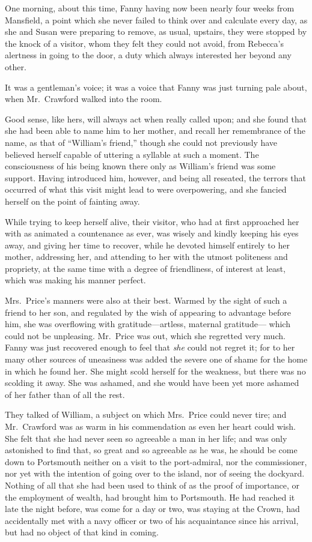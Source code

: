 \documentclass{article}
\begin{document}
One morning, about this time, Fanny having now been nearly
four weeks from Mansfield, a point which she never failed
to think over and calculate every day, as she and Susan
were preparing to remove, as usual, upstairs, they were
stopped by the knock of a visitor, whom they felt they could
not avoid, from Rebecca's alertness in going to the door,
a duty which always interested her beyond any other.

It was a gentleman's voice; it was a voice that Fanny
was just turning pale about, when Mr.\ Crawford walked
into the room.

Good sense, like hers, will always act when really
called upon; and she found that she had been able to name
him to her mother, and recall her remembrance of the name,
as that of ``William's friend,'' though she could not
previously have believed herself capable of uttering a
syllable at such a moment.  The consciousness of his being
known there only as William's friend was some support.
Having introduced him, however, and being all reseated,
the terrors that occurred of what this visit might lead
to were overpowering, and she fancied herself on the point
of fainting away.

While trying to keep herself alive, their visitor, who had
at first approached her with as animated a countenance
as ever, was wisely and kindly keeping his eyes away,
and giving her time to recover, while he devoted himself
entirely to her mother, addressing her, and attending to
her with the utmost politeness and propriety, at the same
time with a degree of friendliness, of interest at least,
which was making his manner perfect.

Mrs.\ Price's manners were also at their best.  Warmed by
the sight of such a friend to her son, and regulated
by the wish of appearing to advantage before him, she was
overflowing with gratitude---artless, maternal gratitude---%
which could not be unpleasing.  Mr.\ Price was out,
which she regretted very much.  Fanny was just recovered
enough to feel that \emph{she} could not regret it; for to her
many other sources of uneasiness was added the severe
one of shame for the home in which he found her.
She might scold herself for the weakness, but there was
no scolding it away.  She was ashamed, and she would have
been yet more ashamed of her father than of all the rest.

They talked of William, a subject on which Mrs.\ Price
could never tire; and Mr.\ Crawford was as warm in his
commendation as even her heart could wish.  She felt
that she had never seen so agreeable a man in her life;
and was only astonished to find that, so great and so
agreeable as he was, he should be come down to Portsmouth
neither on a visit to the port-admiral, nor the commissioner,
nor yet with the intention of going over to the island,
nor of seeing the dockyard.  Nothing of all that she
had been used to think of as the proof of importance,
or the employment of wealth, had brought him to Portsmouth.
He had reached it late the night before, was come for a
day or two, was staying at the Crown, had accidentally
met with a navy officer or two of his acquaintance since
his arrival, but had no object of that kind in coming.
\end{document}
